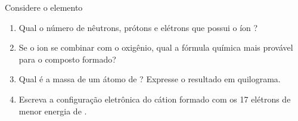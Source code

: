Considere o elemento 

\begin{enumerate}[label = (\alph*)]
	\item Qual o número de nêutrons, prótons e elétrons que possui o íon ?
	\item Se o ion  se combinar com o oxigênio, qual a fórmula química mais provável para o composto formado?
	\item Qual é a massa de um átomo de ? Expresse o resultado em quilograma.
	\item Escreva a configuração eletrônica do cátion formado com os 17 elétrons de menor energia de .
\end{enumerate}
